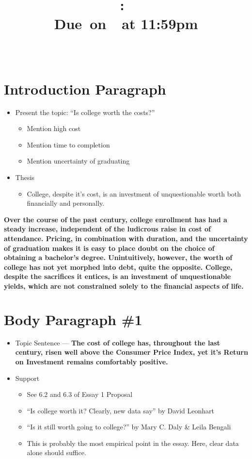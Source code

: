 \documentclass{article}
\title{
        \vspace{2in}
        \textmd{\textbf{\hmwkClass:\ \hmwkTitle}}\\
        \normalsize\vspace{0.1in}\small{Due\ on\ \hmwkDueDate\ at 11:59pm}\\
        \vspace{0.1in}\large{\textit{\hmwkClassInstructor\ \hmwkClassTime}}
        \vspace{3in}
    }
\author{\hmwkAuthorName}
\date{}
\begin{document}
\maketitle
\pagebreak
\section{Introduction Paragraph}
\begin{itemize}
    \item Present the topic: ``Is college worth the costs?''
    \begin{itemize}
        \item Mention high cost
        \item Mention time to completion
        \item Mention uncertainty of graduating
    \end{itemize}
    \item Thesis
    \begin{itemize}
        \item College, despite it's cost, is an investment of unquestionable 
        worth both financially and personally.
    \end{itemize}
\end{itemize}
\textbf{Over the course of the past century, college enrollment 
has had a steady increase, independent of the ludicrous raise in cost
of attendance. Pricing, in combination with duration, and the uncertainty
of graduation makes it is easy to place doubt on the choice of 
obtaining a bachelor's degree. Unintuitively, however, the worth of
college has not yet morphed into debt, quite the opposite. College, 
despite the sacrifices it entices, is an investment of unquestionable
yields, which are not constrained solely to the financial aspects of life.
}
\section{Body Paragraph \#1}
\begin{itemize}
    \item Topic Sentence --- \textbf{The cost of college has, throughout the 
    last century, risen well above the Consumer Price Index, yet it's Return on
    Investment remains comfortably positive.}
    \item Support
    \begin{itemize}
        \item See 6.2 and 6.3 of Essay 1 Proposal
        \item “Is college worth it? Clearly, new data say” by David Leonhart
        \item “Is it still worth going to college?” by Mary C. Daly \& Leila Bengali
        \item This is probably the most empirical point in the essay. Here, 
        clear data alone should suffice.
    \end{itemize}
\end{itemize}
\end{document}
